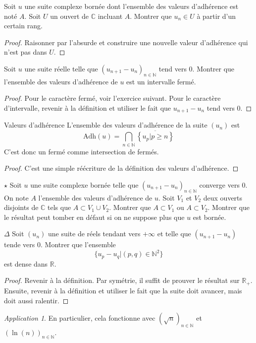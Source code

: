 \documentclass[french,a4paper]{article}
\newcommand{\N}{\mathbb{N}}
\newcommand{\R}{\mathbb{R}}
\newcommand{\C}{\mathbb{C}}
\theoremstyle{plain}
\theoremstyle{definition}
\theoremstyle{remark}
\newtheorem*{app}{Application}
\begin{document}
\begin{ex}{}
	Soit $u$ une suite complexe bornée dont l'ensemble des valeurs d'adhérence est noté $A$. Soit $U$ un ouvert de $\C$ incluant $A$. Montrer que $u_n\in U$ à partir d'un certain rang.
\end{ex}
\begin{proof}
	Raisonner par l'absurde et construire une nouvelle valeur d'adhérence qui n'est pas dans $U$.
\end{proof}

\begin{ex}{}
	Soit $u$ une suite réelle telle que $(u_{n+1}-u_n)_{n\in\N}$ tend vers $0$. Montrer que l'ensemble des valeurs d'adhérence de $u$ est un intervalle fermé.
\end{ex}
\begin{proof}
	Pour le caractère fermé, voir l'exercice suivant. Pour le caractère d'intervalle, revenir à la définition et utiliser le fait que $u_{n+1}-u_n$ tend vers $0$.
\end{proof}

\begin{ex}{Valeurs d'adhérence} L'ensemble des valeurs d'adhérence de la suite $(u_n)$ est $$\text{Adh}(u)=\bigcap_{n\in\N}\overline{\left\{u_p|p\geqslant n\right\}}$$ C'est donc un fermé comme intersection de fermés.
\end{ex}
\begin{proof}
	C'est une simple réécriture de la définition des valeurs d'adhérence.
\end{proof}

\begin{ex}{$\star$}
	Soit $u$ une suite complexe bornée telle que $(u_{n+1}-u_n)_{n\in\N}$ converge vers $0$. On note $A$ l'ensemble des valeurs d'adhérence de $u$. Soit $V_1$ et $V_2$ deux ouverts disjoints de $\C$ tels que $A\subset V_1\cup V_2$. Montrer que $A\subset V_1$ ou $A\subset V_2$. Montrer que le résultat peut tomber en défaut si on ne suppose plus que $u$ est bornée.
\end{ex}

\begin{ex}{$\Delta$}
	Soit $(u_n)$ une suite de réels tendant vers $+\infty$ et telle que $(u_{n+1}-u_n)$ tende vers $0$. Montrer que l'ensemble $$\{u_p-u_q|(p,q)\in\N^2\}$$ est dense dans $\R$.
\end{ex}
\begin{proof}
	Revenir à la définition. Par symétrie, il suffit de prouver le résultat sur $\R_+$. Ensuite, revenir à la définition et utiliser le fait que la suite doit avancer, mais doit aussi ralentir.
\end{proof}
\begin{app}
	En particulier, cela fonctionne avec $(\sqrt{n})_{n\in\N}$ et $(\ln(n))_{n\in\N}$.
\end{app}
\end{document}

